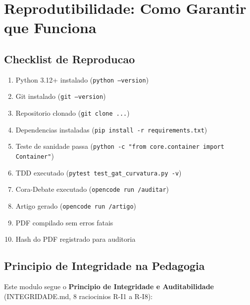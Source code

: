 \section{Reprodutibilidade: Como Garantir que Funciona}

\subsection{Checklist de Reproducao}

\begin{enumerate}[nosep]
 \item[$\square$] Python 3.12+ instalado (\texttt{python --version})
 \item[$\square$] Git instalado (\texttt{git --version})
 \item[$\square$] Repositorio clonado (\texttt{git clone ...})
 \item[$\square$] Dependencias instaladas (\texttt{pip install -r requirements.txt})
 \item[$\square$] Teste de sanidade passa (\texttt{python -c "from core.container import Container"})
 \item[$\square$] TDD executado (\texttt{pytest test\_gat\_curvatura.py -v})
 \item[$\square$] Cora-Debate executado (\texttt{opencode run /auditar})
 \item[$\square$] Artigo gerado (\texttt{opencode run /artigo})
 \item[$\square$] PDF compilado sem erros fatais
 \item[$\square$] Hash do PDF registrado para auditoria
\end{enumerate}

\subsection{Principio de Integridade na Pedagogia}

Este modulo segue o \textbf{Principio de Integridade e Auditabilidade}
(INTEGRIDADE.md, 8 raciocinios R-I1 a R-I8):

